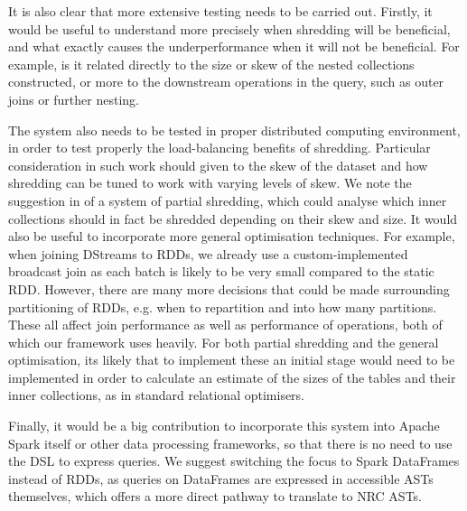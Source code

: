 It is also clear that more extensive testing needs to be carried out. Firstly, it would be useful to understand more precisely when shredding will be beneficial, and what exactly causes the underperformance when it will not be beneficial. For example, is it related directly to the size or skew of the nested collections constructed, or more to the downstream operations in the query, such as outer joins or further nesting.

The system also needs to be tested in proper distributed computing environment, in order to test properly the load-balancing benefits of shredding. Particular consideration in such work should given to the skew of the dataset and how shredding can be tuned to work with varying levels of skew. We note the suggestion in \cite{draftpaper} of a system of partial shredding, which could analyse which inner collections should in fact be shredded depending on their skew and size.
It would also be useful to incorporate more general optimisation techniques. For example, when joining DStreams to RDDs, we already use a custom-implemented broadcast join as each batch is likely to be very small compared to the static RDD. However, there are many more decisions that could be made surrounding partitioning of RDDs, e.g. when to repartition and into how many partitions. These all affect join performance as well as performance of  operations, both of which our framework uses heavily.
For both partial shredding and the general optimisation, its likely that to implement these an initial stage would need to be implemented in order to calculate an estimate of the sizes of the tables and their inner collections, as in standard relational optimisers.


Finally, it would be a big contribution to incorporate this system into Apache Spark itself or other data processing frameworks, so that there is no need to use the DSL to express queries. We suggest switching the focus to Spark DataFrames instead of RDDs, as queries on DataFrames are expressed in accessible ASTs themselves, which offers a more direct pathway to translate to NRC ASTs.
